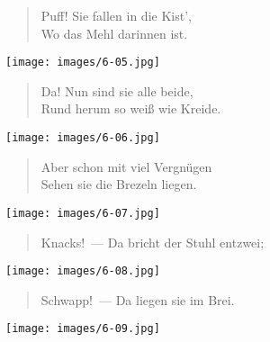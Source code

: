 \documentclass[a4paper,12pt]{article}
\begin{document}
\begin{verse}
Puff! Sie fallen in die Kist',\\{}
Wo das Mehl darinnen ist.
\end{verse}



\begin{center}\texttt{[image: images/6-05.jpg]}\end{center}



\begin{verse}
Da! Nun sind sie alle beide,\\{}
Rund herum so weiß wie Kreide.
\end{verse}



\begin{center}\texttt{[image: images/6-06.jpg]}\end{center}



\begin{verse}
Aber schon mit viel Vergnügen\\{}
Sehen sie die Brezeln liegen.
\end{verse}



\begin{center}\texttt{[image: images/6-07.jpg]}\end{center}



\begin{verse}
Knacks!~— Da bricht der Stuhl entzwei;
\end{verse}



\begin{center}\texttt{[image: images/6-08.jpg]}\end{center}



\begin{verse}
Schwapp!~— Da liegen sie im Brei.
\end{verse}



\begin{center}\texttt{[image: images/6-09.jpg]}\end{center}
\end{document}
